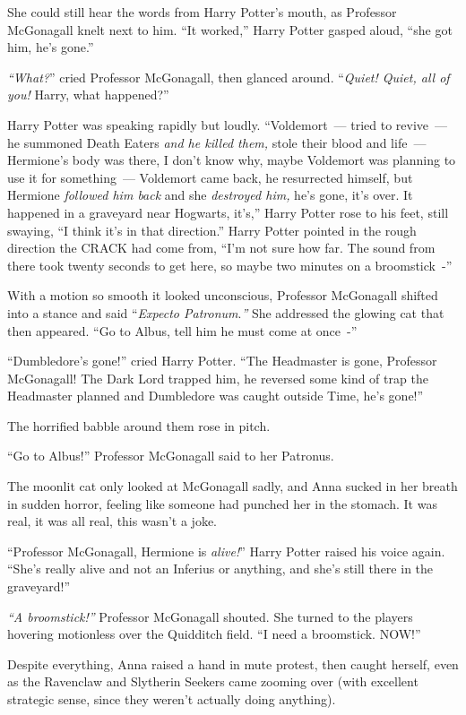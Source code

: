 She could still hear the words from Harry Potter's mouth, as Professor McGonagall knelt next to him. ``It worked,'' Harry Potter gasped aloud, ``she got him, he's gone.''

\emph{``What?}'' cried Professor McGonagall, then glanced around. ``\emph{Quiet! Quiet, all of you!} Harry, what happened?''

Harry Potter was speaking rapidly but loudly. ``Voldemort~--- tried to revive~--- he summoned Death Eaters \emph{and he killed them,} stole their blood and life~--- Hermione's body was there, I don't know why, maybe Voldemort was planning to use it for something~--- Voldemort came back, he resurrected himself, but Hermione \emph{followed him back} and she \emph{destroyed him,} he's gone, it's over. It happened in a graveyard near Hogwarts, it's,'' Harry Potter rose to his feet, still swaying, ``I think it's in that direction.'' Harry Potter pointed in the rough direction the CRACK had come from, ``I'm not sure how far. The sound from there took twenty seconds to get here, so maybe two minutes on a broomstick~-''

With a motion so smooth it looked unconscious, Professor McGonagall shifted into a stance and said ``\emph{Expecto Patronum}.\emph{''} She addressed the glowing cat that then appeared. ``Go to Albus, tell him he must come at once~-''

``Dumbledore's gone!'' cried Harry Potter. ``The Headmaster is gone, Professor McGonagall! The Dark Lord trapped him, he reversed some kind of trap the Headmaster planned and Dumbledore was caught outside Time, he's gone!''

The horrified babble around them rose in pitch.

``Go to Albus!'' Professor McGonagall said to her Patronus.

The moonlit cat only looked at McGonagall sadly, and Anna sucked in her breath in sudden horror, feeling like someone had punched her in the stomach. It was real, it was all real, this wasn't a joke.

``Professor McGonagall, Hermione is \emph{alive!}'' Harry Potter raised his voice again. ``She's really alive and not an Inferius or anything, and she's still there in the graveyard!''

\emph{``A broomstick!''} Professor McGonagall shouted. She turned to the players hovering motionless over the Quidditch field. ``I need a broomstick. NOW!''

Despite everything, Anna raised a hand in mute protest, then caught herself, even as the Ravenclaw and Slytherin Seekers came zooming over (with excellent strategic sense, since they weren't actually doing anything).

